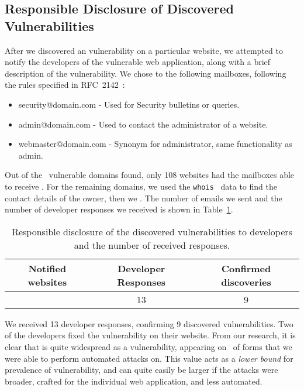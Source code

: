 \subsection{Responsible Disclosure of Discovered Vulnerabilities}
After we discovered an \ehi vulnerability on a particular website, we attempted to notify the developers of the vulnerable web application, along with a brief description of the vulnerability.
We chose to \email the following mailboxes, following the rules specified in RFC~2142~\cite{rfc2142}:
\begin{itemize}
	\item security@domain.com - Used for Security bulletins or queries.
	\item admin@domain.com - Used to contact the administrator of a website.
	\item webmaster@domain.com - Synonym for administrator, same functionality as admin.
\end{itemize}

Out of the \domains\ vulnerable domains found, only 108 websites had the mailboxes able to receive \emails. For the remaining domains, we used the \texttt{whois}~\cite{whois} data to find the contact details of the owner, then we \emailed. The number of emails we sent and the number of developer responses we received is shown in Table~\ref{tab:devresp}.

\begin{table}[tbp]
\centering
\begin{tabular}{|c|c|c|}
	\hline
	\multicolumn{1}{|p{2cm}}{\centering \textbf{Notified websites}} &
	\multicolumn{1}{|p{2cm}|}{\centering \textbf{Developer Responses}} &
	\multicolumn{1}{p{2cm}|}{\centering \textbf{Confirmed discoveries}}\\
	\hline
	\domains\ & 13 & 9 \\
	\hline
\end{tabular}
	\caption[\titlecap{}]{Responsible disclosure of the discovered vulnerabilities to developers and the number of received responses.}
	\label{tab:devresp}
\end{table}

We received 13 developer responses, confirming 9 discovered vulnerabilities. Two of the developers fixed the vulnerability on their website.
From our research, it is clear that \ehi is quite widespread as a vulnerability, appearing on \successDelta\ of forms that we were able to perform automated attacks on. This value acts as a \emph{lower bound} for prevalence of \ehi vulnerability, and can quite easily be larger if the attacks were broader, crafted for the individual web application, and  less automated. 
